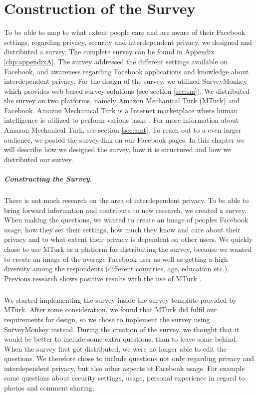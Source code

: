 \chapter{Construction of the Survey}
\label{chp:amtsurvey} 

To be able to map to what extent people care and are aware of their Facebook settings, regarding privacy, security and interdependent privacy, we designed and distributed a survey. The complete survey can be found in Appendix \ref{chp:appendixA}. The survey addressed the different settings available on Facebook, and awareness regarding Facebook applications and knowledge about interdependent privacy. For the design of the survey, we utilized SurveyMonkey which provides web-based survey solutions (see section \ref{sec:sm}). We distributed the survey on two platforms, namely Amazon Mechanical Turk (MTurk) and Facebook. Amazon Mechanical Turk is a Internet marketplace where human intelligence is utilized to perform various tasks \cite{amazonweb}. For more information about Amazon Mechanical Turk, see section \ref{sec:amt}. To reach out to a even larger audience, we posted the survey-link on our Facebook pages. In this chapter we will describe how we designed the survey, how it is structured and how we distributed our survey.


\paragraph{Constructing the Survey.}
There is not much research on the area of interdependent privacy. To be able to bring forward information and contribute to new research, we created a survey. When making the questions, we wanted to create an image of peoples Facebook usage, how they set their settings, how much they know and care about their privacy and to what extent their privacy is dependent on other users. We quickly chose to use MTurk as a platform for distributing the survey, because we wanted to create an image of the average Facebook user as well as getting a high diversity among the respondents (different countries, age, education etc.). Previous research shows positive results with the use of MTurk \cite{expectations,incentivesAmt}. 

\paragraph{}
We started implementing the survey inside the survey template provided by MTurk. After some consideration, we found that MTurk did fulfil our requirements for design, so we chose to implement the survey using SurveyMonkey instead. During the creation of the survey, we thought that it would be better to include some extra questions, than to leave some behind. When the survey first got distributed, we were no longer able to edit the questions. We therefore chose to include questions not only regarding privacy and interdependent privacy, but also other aspects of Facebook usage. For example some questions about security settings, usage, personal experience in regard to photos and comment sharing.


